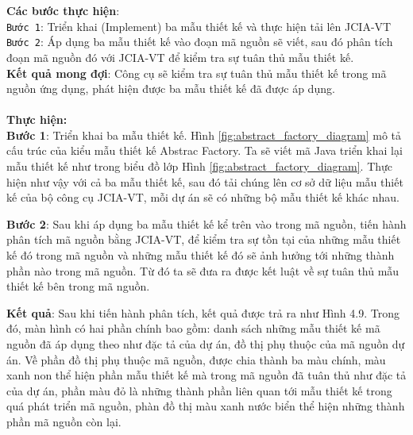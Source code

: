 \documentclass[12pt]{report}
\begin{document}
\noindent \textbf{Các bước thực hiện}:\\
\texttt{Bước 1}: Triển khai (Implement) ba mẫu thiết kế và thực hiện tải lên JCIA-VT\\
\texttt{Bước 2}: Áp dụng ba mẫu thiết kế vào đoạn mã nguồn sẽ viết, sau đó phân tích đoạn mã nguồn đó với JCIA-VT để kiểm tra sự tuân thủ mẫu thiết kế.\\
\noindent \textbf{Kết quả mong đợi}: Công cụ sẽ kiểm tra sự tuân thủ mẫu thiết kế trong mã nguồn ứng dụng, phát hiện được ba mẫu thiết kế đã được áp dụng.\\\\
\noindent \textbf{Thực hiện:}\\
\noindent \textbf{Bước 1}: Triển khai ba mẫu thiết kế. Hình \ref{fig:abstract_factory_diagram} mô tả cấu trúc của kiểu mẫu thiết kế Abstrac Factory. Ta sẽ viết mã Java triển khai lại mẫu thiết kế như trong biểu đồ lớp Hình \ref{fig:abstract_factory_diagram}. Thực hiện như vậy với cả ba mẫu thiết kế, sau đó tải chúng lên cơ sở dữ liệu mẫu thiết kế của bộ công cụ JCIA-VT, mỗi dự án sẽ có những bộ mẫu thiết kế khác nhau.

\noindent \textbf{Bước 2}: Sau khi áp dụng ba mẫu thiết kế kể trên vào trong mã nguồn, tiến hành phân tích mã nguồn bằng JCIA-VT, để kiểm tra sự tồn tại của những mẫu thiết kế đó trong mã nguồn và những mẫu thiết kế đó sẽ ảnh hưởng tới những thành phần nào trong mã nguồn. Từ đó ta sẽ đưa ra được kết luật về sự tuân thủ mẫu thiết kế bên trong mã nguồn.

\noindent \textbf{Kết quả}: Sau khi tiến hành phân tích, kết quả được trả ra như Hình 4.9. Trong đó, màn hình có hai phần chính bao gồm: danh sách những mẫu thiết kế mã nguồn đã áp dụng theo như đặc tả của dự án, đồ thị phụ thuộc của mã nguồn dự án. Về phần đồ thị phụ thuộc mã nguồn, được chia thành ba màu chính, màu xanh non thể hiện phần mẫu thiết kế mà trong mã nguồn đã tuân thủ như đặc tả của dự án, phần màu đỏ là những thành phần liên quan tới mẫu thiết kế trong quá phát triển mã nguồn, phàn đồ thị màu xanh nước biển thể hiện những thành phần mã nguồn còn lại.
\end{document}
